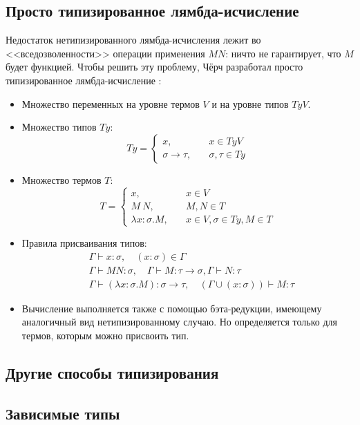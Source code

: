 \subsection{Просто типизированное лямбда-исчисление}

Недостаток нетипизированного лямбда-исчисления лежит во <<вседозволенности>>
операции применения \(M N\): ничто не гарантирует, что \(M\) будет функцией.
Чтобы решить эту проблему, Чёрч разработал просто типизированное лямбда-исчисление
\cite{lambda-calculi-with-types}:
\begin{itemize}
\item Множество переменных на уровне термов \(V\) и на уровне типов \(TyV\).
\item Множество типов \(Ty\):
   \[
   Ty = \left\{
   \begin{array}{lr}
   x,\quad& x \in TyV\\
   \sigma \rightarrow \tau,\quad& \sigma, \tau \in Ty
   \end{array}
   \right.
   \]
\item Множество термов \(T\):
   \[
   T = \left\{
   \begin{array}{lr}
   x,\quad& x \in V\\
   M\ N,\quad& M, N \in T\\
   \lambda x : \sigma. M,\quad& x \in V, \sigma \in Ty, M \in T
   \end{array}
   \right.
   \]
\item Правила присваивания типов:
   \begin{align*}
   &\Gamma \vdash x : \sigma,\quad (x : \sigma) \in \Gamma\\
   &\Gamma \vdash M N : \sigma,\quad \Gamma \vdash M : \tau \rightarrow \sigma,
      \Gamma \vdash N : \tau\\
   &\Gamma \vdash (\lambda x : \sigma. M) : \sigma \rightarrow \tau,\quad
      (\Gamma \cup (x : \sigma)) \vdash M : \tau
   \end{align*}
\item Вычисление выполняется также с помощью бэта-редукции, имеющему
   аналогичный вид нетипизированному случаю. Но определяется только
   для термов, которым можно присвоить тип.
\end{itemize}

\subsection{Другие способы типизирования}

\subsection{Зависимые типы}
